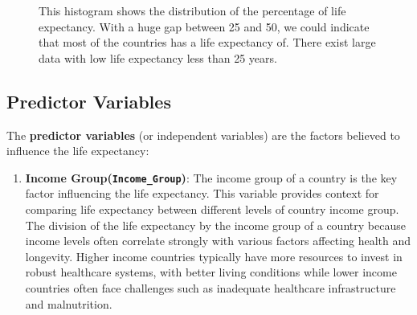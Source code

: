 \documentclass[
  letterpaper,
  DIV=11,
  numbers=noendperiod]{scrartcl}
\providecommand{\tightlist}{%
  \setlength{\itemsep}{0pt}\setlength{\parskip}{0pt}}\usepackage{longtable,booktabs,array}
\begin{document}
\begin{figure}


\caption{\label{fig-expectancy}This histogram shows the distribution of
the percentage of life expectancy. With a huge gap between 25 and 50, we
could indicate that most of the countries has a life expectancy of.
There exist large data with low life expectancy less than 25 years.}

\end{figure}%

\subsection{Predictor Variables}\label{predictor-variables}

The \textbf{predictor variables} (or independent variables) are the
factors believed to influence the life expectancy:

\begin{enumerate}
\def\labelenumi{\arabic{enumi}.}
\tightlist
\item
  \textbf{Income Group(\texttt{Income\_Group})}: The income group of a
  country is the key factor influencing the life expectancy. This
  variable provides context for comparing life expectancy between
  different levels of country income group. The division of the life
  expectancy by the income group of a country because income levels
  often correlate strongly with various factors affecting health and
  longevity. Higher income countries typically have more resources to
  invest in robust healthcare systems, with better living conditions
  while lower income countries often face challenges such as inadequate
  healthcare infrastructure and malnutrition.
\end{enumerate}
\end{document}
